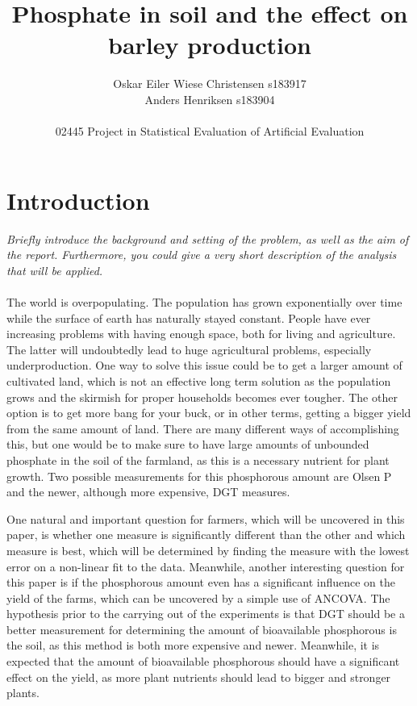 \documentclass[11pt, fleqn, titlepage]{article}
\title{Phosphate in soil and the effect on barley production}
\author{Oskar Eiler Wiese Christensen s183917 \\ Anders Henriksen s183904 \\ \\ 02445 Project in Statistical Evaluation of Artificial Evaluation}
\date{\today \vspace{2.5cm} \section*{\small Summary} 
\justify{\small Farmers will need more effective agriculture as the population grows. This can be accomplished by optimizing the amount of bioavailable phosphorous in the soil. The purpose of this paper is to analyze if more phosphorous leads to more yield and which measure, Olsen P or DGT, is best for getting the biggest possible yield. A linear and non-linear Michaelis-Mentel model have been fit to the data to find the best possible measurement to use, and ANCOVA has been applied for finding the significance of phosphorous for the yield. These analyses have shown that DGT is the best of the two measurements and that phosphorous has a really significant influence on the harvest yield. This shows that phosphorous measurements can be constructive in helping farmers estimate the yield. Meanwhile, when estimating this, DGT is the better of the measurements, though it also costs more, so farmers should take into consideration the cost-benefit of using DGT instead of Olsen P.}}
\begin{document}
\maketitle

\section{Introduction}
\textit{Briefly introduce the background and setting of the problem, as well as the aim of the report. Furthermore, you could give a very short description of the analysis that will be applied.} \\ \\
The world is overpopulating. The population has grown exponentially over time while the surface of earth has naturally stayed constant. People have ever increasing problems with having enough space, both for living and agriculture. The latter will undoubtedly lead to huge agricultural problems, especially underproduction. One way to solve this issue could be to get a larger amount of cultivated land, which is not an effective long term solution as the population grows and the skirmish for proper households becomes ever tougher. The other option is to get more bang for your buck, or in other terms, getting a bigger yield from the same amount of land. There are many different ways of accomplishing this, but one would be to make sure to have large amounts of unbounded phosphate in the soil of the farmland, as this is a necessary nutrient for plant growth. Two possible measurements for this phosphorous amount are Olsen P and the newer, although more expensive, DGT measures. 

One natural and important question for farmers, which will be uncovered in this paper, is whether one measure is significantly different than the other and which measure is best, which will be determined by finding the measure with the lowest error on a non-linear fit to the data. Meanwhile, another interesting question for this paper is if the phosphorous amount even has a significant influence on the yield of the farms, which can be uncovered by a simple use of ANCOVA. The hypothesis prior to the carrying out of the experiments is that DGT should be a better measurement for determining the amount of bioavailable phosphorous is the soil, as this method is both more expensive and newer. Meanwhile, it is expected that the amount of bioavailable phosphorous should have a significant effect on the yield, as more plant nutrients should lead to bigger and stronger plants.
\end{document}
